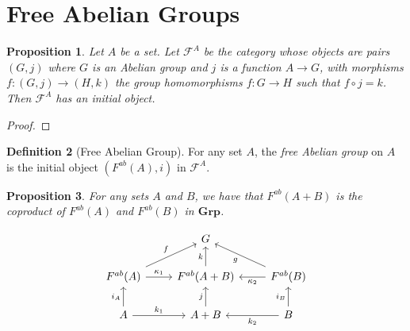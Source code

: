 \documentclass{book}
\let\qed\relax
\newtheorem{prop}{Proposition}[chapter]
\theoremstyle{definition}
\newtheorem{df}[prop]{Definition}
\newcommand{\Grp}{\ensuremath{\mathbf{Grp}}}
\begin{document}
\section{Free Abelian Groups}

\begin{prop}
    Let $A$ be a set. Let $\mathcal{F}^A$ be the category whose objects are pairs $(G,j)$ where $G$ is an Abelian group and $j$ is a function $A \rightarrow G$, with morphisms $f : (G,j) \rightarrow (H,k)$ the group homomorphisms $f : G \rightarrow H$ such that $f \circ j = k$. Then $\mathcal{F}^A$ has an initial object.
\end{prop}

\begin{proof}
    \pf
    \qed
\end{proof}

\begin{df}[Free Abelian Group]
    For any set $A$, the \emph{free Abelian group} on $A$ is the initial object $(F^{ab}(A),i)$ in $\mathcal{F}^A$.
\end{df}

\begin{prop}
    For any sets $A$ and $B$, we have that $F^{ab}(A+B)$ is the coproduct of $F^{ab}(A)$ and $F^{ab}(B)$ in $\Grp$.
\end{prop}

\[ \begin{tikzcd}
    & G & \\
    F^{ab}(A) \arrow[r,"\kappa_1"] \arrow[ur,"f"] & F^{ab}(A+B) \arrow[u,"k"] & \arrow[l,"\kappa_2"] F^{ab}(B) \arrow[ul,"g"] \\
    A \arrow[r,"k_1"] \arrow[u,"i_A"] & A+B \arrow[u,"j"] & \arrow[l,"k_2"] \arrow[u,"i_B"] B
\end{tikzcd} \]
\end{document}
